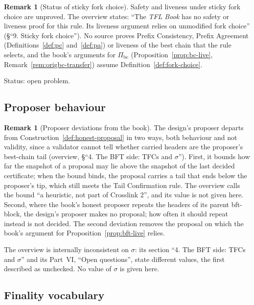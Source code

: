 \documentclass[11pt,a4paper]{article}
\theoremstyle{definition}
\newtheorem{remark}[theorem]{Remark}
\newcommand{\bc}{\mathrm{bc}}
\newcommand{\Pibc}{\Pi_{\bc}}
\begin{document}
\begin{remark}[Status of sticky fork choice]\label{rem:sticky-open}
Safety and liveness under sticky fork choice are unproved. The overview
states: ``The \emph{TFL Book} has no safety or liveness proof for this rule.
Its liveness argument relies on unmodified fork choice'' (\S``9. Sticky fork
choice''). No source proves Prefix Consistency, Prefix Agreement
(Definitions~\ref{def:pc} and~\ref{def:pa}) or liveness of the best chain
that the rule selects, and the book's arguments for $\Pibc$
(Proposition~\ref{prop:bc-live}, Remark~\ref{rem:origbc-transfer}) assume
Definition~\ref{def:fork-choice}.

Status: open problem.
\end{remark}

\subsection{Proposer behaviour}\label{sec:sl-proposer}

\begin{remark}[Proposer deviations from the book]\label{rem:sl-proposer}
The design's proposer departs from Construction~\ref{def:honest-proposal} in
two ways, both behaviour and not validity, since a validator cannot tell
whether carried headers are the proposer's best-chain tail (overview, \S``4. The
BFT side: TFCs and $\sigma$''). First, it bounds how far the snapshot of a
proposal may lie above the snapshot of the last decided certificate; when the
bound binds, the proposal carries a tail that ends below the proposer's tip,
which still meets the Tail Confirmation rule. The overview calls the bound ``a
heuristic, not part of Crosslink 2'', and its value is not given here. Second,
where the book's honest proposer repeats the headers of its parent bft-block,
the design's proposer makes no proposal; how often it should repeat instead is
not decided. The second deviation removes the proposal on which the book's
argument for Proposition~\ref{prop:bft-live} relies.
\end{remark}

The overview is internally inconsistent on $\sigma$: its section ``4. The BFT
side: TFCs and $\sigma$'' and its Part~VI, ``Open questions'', state
different values, the first described as unchecked. No value of $\sigma$ is
given here.

\subsection{Finality vocabulary}\label{sec:sl-finality}
\end{document}
